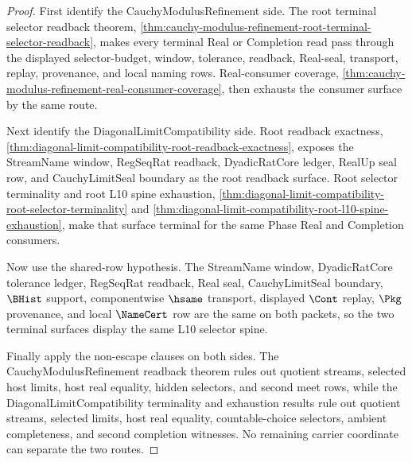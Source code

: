 \begin{proof}
First identify the CauchyModulusRefinement side. The root terminal selector readback theorem, \autoref{thm:cauchy-modulus-refinement-root-terminal-selector-readback}, makes every terminal Real or Completion read pass through the displayed selector-budget, window, tolerance, readback, Real-seal, transport, replay, provenance, and local naming rows. Real-consumer coverage, \autoref{thm:cauchy-modulus-refinement-real-consumer-coverage}, then exhausts the consumer surface by the same route.

Next identify the DiagonalLimitCompatibility side. Root readback exactness, \autoref{thm:diagonal-limit-compatibility-root-readback-exactness}, exposes the StreamName window, RegSeqRat readback, DyadicRatCore ledger, RealUp seal row, and CauchyLimitSeal boundary as the root readback surface. Root selector terminality and root L10 spine exhaustion, \autoref{thm:diagonal-limit-compatibility-root-selector-terminality} and \autoref{thm:diagonal-limit-compatibility-root-l10-spine-exhaustion}, make that surface terminal for the same Phase Real and Completion consumers.

Now use the shared-row hypothesis. The StreamName window, DyadicRatCore tolerance ledger, RegSeqRat readback, Real seal, CauchyLimitSeal boundary, $\BHist$ support, componentwise $\hsame$ transport, displayed $\Cont$ replay, $\Pkg$ provenance, and local $\NameCert$ row are the same on both packets, so the two terminal surfaces display the same L10 selector spine.

Finally apply the non-escape clauses on both sides. The CauchyModulusRefinement readback theorem rules out quotient streams, selected host limits, host real equality, hidden selectors, and second meet rows, while the DiagonalLimitCompatibility terminality and exhaustion results rule out quotient streams, selected limits, host real equality, countable-choice selectors, ambient completeness, and second completion witnesses. No remaining carrier coordinate can separate the two routes.
\end{proof}

